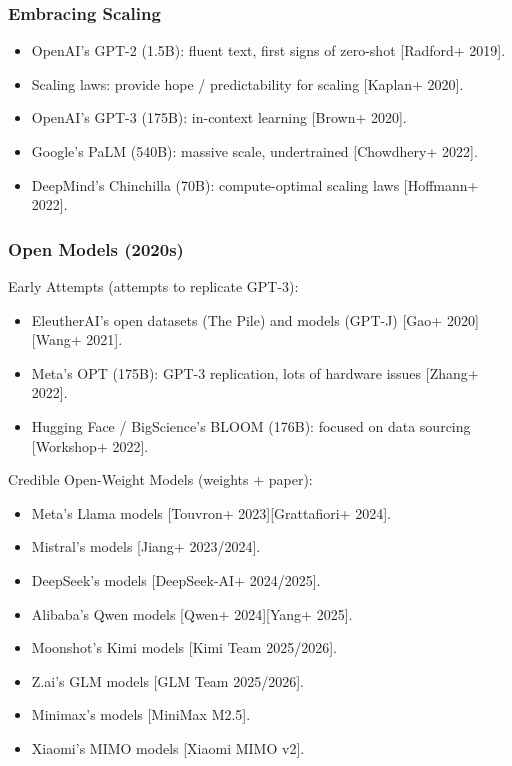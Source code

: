 \documentclass[12pt,twoside]{article}
\begin{document}
\subsubsection*{Embracing Scaling}

\begin{itemize}
    \item OpenAI's GPT-2 (1.5B): fluent text, first signs of zero-shot [Radford+ 2019].
    \item Scaling laws: provide hope / predictability for scaling [Kaplan+ 2020].
    \item OpenAI's GPT-3 (175B): in-context learning [Brown+ 2020].
    \item Google's PaLM (540B): massive scale, undertrained [Chowdhery+ 2022].
    \item DeepMind's Chinchilla (70B): compute-optimal scaling laws [Hoffmann+ 2022].
\end{itemize}

\subsubsection*{Open Models (2020s)}

Early Attempts (attempts to replicate GPT-3):

\begin{itemize}
    \item EleutherAI's open datasets (The Pile) and models (GPT-J) [Gao+ 2020][Wang+ 2021].
    \item Meta's OPT (175B): GPT-3 replication, lots of hardware issues [Zhang+ 2022].
    \item Hugging Face / BigScience's BLOOM (176B): focused on data sourcing [Workshop+ 2022].
\end{itemize}

Credible Open-Weight Models (weights + paper):

\begin{itemize}
    \item Meta's Llama models [Touvron+ 2023][Grattafiori+ 2024].
    \item Mistral's models [Jiang+ 2023/2024].
    \item DeepSeek's models [DeepSeek-AI+ 2024/2025].
    \item Alibaba's Qwen models [Qwen+ 2024][Yang+ 2025].
    \item Moonshot's Kimi models [Kimi Team 2025/2026].
    \item Z.ai's GLM models [GLM Team 2025/2026].
    \item Minimax's models [MiniMax M2.5].
    \item Xiaomi's MIMO models [Xiaomi MIMO v2].
\end{itemize}
\end{document}
